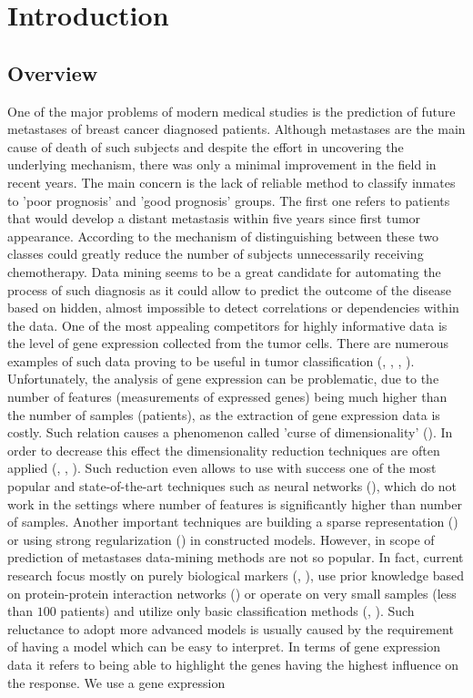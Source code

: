 \documentclass[shortabstract, english, mgr]{iithesis}
\author{Stanisław Wilczyński}
\begin{document}
\chapter{Introduction} \label{section:intro}

\section{Overview}
One of the major problems of modern medical studies is the prediction of future metastases of breast cancer diagnosed patients. Although metastases are the main cause of death of such subjects and despite the effort in uncovering the underlying mechanism, there was only a minimal improvement in the field in recent years. The main concern is the lack of reliable method to classify inmates to 'poor prognosis' and 'good prognosis' groups. The first one refers to patients that would develop a distant metastasis within five years since first tumor appearance. According to \cite{Metastasis1} the mechanism of distinguishing between these two classes could greatly reduce the number of subjects unnecessarily receiving chemotherapy. Data mining seems to be a great candidate for automating the process of such diagnosis as it could allow to predict the outcome of the disease based on hidden, almost impossible to detect correlations or dependencies within the data. One of the most appealing competitors for highly informative data is the level of gene expression collected from the tumor cells. There are numerous examples of such data proving to be useful in tumor classification (\cite{BreastCancerClassification}, \cite{TumorMolecularClass}, \cite{TumorsClass1}, \cite{TumorClass2}). Unfortunately, the analysis of gene expression can be problematic, due to the number of features (measurements of expressed genes) being much higher than the number of samples (patients), as the extraction of gene expression data is costly. Such relation causes a phenomenon called 'curse of dimensionality' (\cite[p. 22-26]{ESL2}). In order to decrease this effect the dimensionality reduction techniques are often applied (\cite{MasterArts}, \cite{TumorClass4}, \cite{TumorPLS}). Such reduction even allows to use with success one of the most popular and state-of-the-art techniques such as neural networks (\cite{fDNN}), which do not work in the settings where number of features is significantly higher than number of samples. Another important techniques are building a sparse representation (\cite{TumorClass3}) or using strong regularization (\cite[p. 649-666]{ESL2}) in constructed models. However, in scope of prediction of metastases data-mining methods are not so popular. In fact, current research focus mostly on purely biological markers (\cite{Metastasis4}, \cite{dataOrigin}), use prior knowledge based on protein-protein interaction networks (\cite{MetastasisScores}) or operate on very small samples (less than $100$ patients) and utilize only basic classification methods (\cite{Metastasis1}, \cite{Metastasis2}). Such reluctance to adopt more advanced models is usually caused by the requirement of having a model which can be easy to interpret. In terms of gene expression data it refers to being able to highlight the genes having the highest influence on the response. We use a gene expression 
\end{document}
